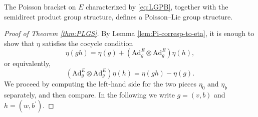\documentclass[10pt,a4paper]{amsart}
\newcommand{\Ad}{\mathrm{Ad}}
\newcommand{\fr}[1]{\mathfrak{#1}}
\newcommand{\ox}{\otimes}
\newcommand{\pr}{\prime}
\begin{document}
\begin{thm}\label{thm:PLGS}
The Poisson bracket on $E$ characterized by \eqref{eq:LGPB}, together with the semidirect product group structure, defines a Poisson--Lie group structure.
\end{thm}

\begin{proof}[Proof of Theorem \ref{thm:PLGS}]
By Lemma \ref{lem:Pi-corresp-to-eta}, it is enough to show that $\eta$ satisfies the cocycle condition
\[
\eta(g h) = \eta(g) + \left( \Ad^{E}_g \ox \Ad^{E}_g \right) \eta(h),
\]
or equivalently,
\[
\left( \Ad^{E}_g \ox \Ad^{E}_g \right) \eta(h) = \eta(g h) - \eta(g) .
\]
We proceed by computing the left-hand side for the two pieces $\eta_0$ and $\eta_{\fr{b}}$ separately, and then compare.
In the following we write $g = (v, b)$ and $h = (w, b^\pr)$.


\end{proof}
\end{document}
